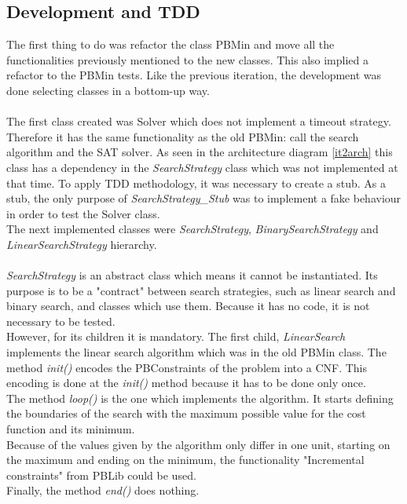\subsection{Development and TDD}
The first thing to do was refactor the class PBMin and move all the functionalities previously mentioned to the new classes. This also implied a refactor to the PBMin tests. Like the previous iteration, the development was done selecting classes in a bottom-up way.  \\\\
The first class created was Solver which does not implement a timeout strategy. Therefore it has the same functionality as the old PBMin: call the search algorithm and the SAT solver. As seen in the architecture diagram \ref{it2arch} this class has a dependency in the \emph{SearchStrategy} class which was not implemented at that time. To apply TDD methodology, it was necessary to create a stub. As a stub, the only purpose of \emph{SearchStrategy\_Stub} was to implement a fake behaviour in order to test the Solver class. \\
The next implemented classes were \emph{SearchStrategy}, \emph{BinarySearchStrategy} and \emph{LinearSearchStrategy} hierarchy.  \\\\
\emph{SearchStrategy} is an abstract class which means it cannot be instantiated. Its purpose is to be a "contract" between search strategies, such as linear search and binary search, and classes which use them. Because it has no code, it is not necessary to be tested.  \\
However, for its children it is mandatory. The first child, \emph{LinearSearch} implements the linear search algorithm which was in the old PBMin class. The method \emph{init()} encodes the PBConstraints of the problem into a CNF. This encoding is done at the \emph{init()} method because it has to be done only once.  \\
The method \emph{loop()} is the one which implements the algorithm. It starts defining the boundaries of the search with the maximum possible value for the cost function and its minimum.  \\
Because of the values given by the algorithm only differ in one unit, starting on the maximum and ending on the minimum, the functionality "Incremental constraints" from PBLib could be used.\\ %
Finally, the method \emph{end()} does nothing. \\
